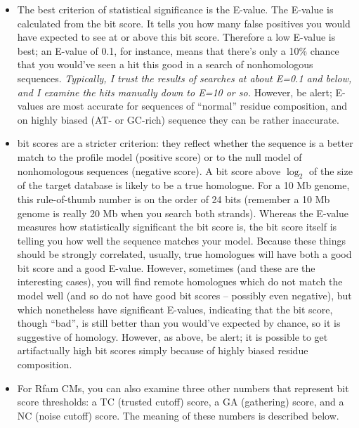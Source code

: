 \begin{itemize}
\item The best criterion of statistical significance is the E-value.
The E-value is calculated from the bit score. It tells you how many
false positives you would have expected to see at or above this bit
score. Therefore a low E-value is best; an E-value of 0.1, for
instance, means that there's only a 10\% chance that you would've seen
a hit this good in a search of nonhomologous sequences. {\em
Typically, I trust the results of searches at about E=0.1 and below,
and I examine the hits manually down to E=10 or so.}  However, be
alert;  E-values are most accurate for sequences of
``normal'' residue composition, and on highly biased (AT- or GC-rich)
sequence they can be rather inaccurate.

\item {} bit scores are a stricter criterion: they
  reflect whether the sequence is a better match to the profile model
  (positive score) or to the null model of nonhomologous sequences
  (negative score).  A bit score above $\log_2$ of the size of the
  target database is likely to be a true
  homologue. For a 10 Mb genome, this rule-of-thumb number is on
  the order of 24 bits (remember a 10 Mb genome is really 20 Mb when
  you search both strands).  Whereas the E-value measures how
  statistically significant the bit score is, the bit score itself is
  telling you how well the sequence matches your model. Because these
  things should be strongly correlated, usually, true homologues will
  have both a good bit score and a good E-value. However, sometimes
  (and these are the interesting cases), you will find remote
  homologues which do not match the model well (and so do not have
  good bit scores -- possibly even negative), but which nonetheless
  have significant E-values, indicating that the bit score, though
  ``bad'', is still better than you would've expected by chance, so it
  is suggestive of homology. However, as above, be alert; it is
  possible to get artifactually high bit scores simply because of
  highly biased residue composition.

\item For Rfam CMs, you can also examine three other numbers that
represent bit score thresholds: a TC (trusted cutoff) score, a GA
(gathering) score, and a NC (noise cutoff) score. The meaning of
these numbers is described below.
\end{itemize}

